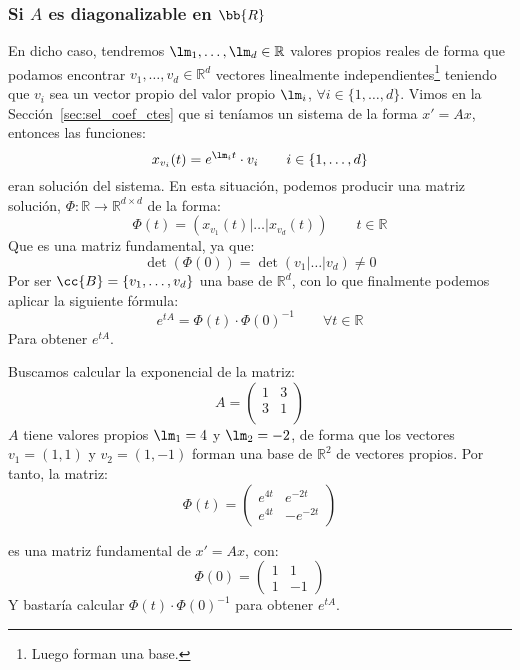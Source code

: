 \subsubsection{Si $A$ es diagonalizable en $\bb{R}$}
\noindent
En dicho caso, tendremos $\lm_1,\ldots,\lm_d\in \mathbb{R}$ valores propios reales de forma que podamos encontrar $v_1,\ldots,v_d\in \mathbb{R}^d$ vectores linealmente independientes\footnote{Luego forman una base.} teniendo que $v_i$ sea un vector propio del valor propio $\lm_i$, $\forall i \in \{1,\ldots,d\}$. Vimos en la Sección~\ref{sec:sel_coef_ctes} que si teníamos un sistema de la forma $x'=Ax$, entonces las funciones:
\begin{equation*}
    x_{v_i}(t) = e^{\lm_i t} \cdot v_i \qquad i \in \{1,\ldots,d\}
\end{equation*}
eran solución del sistema. En esta situación, podemos producir una matriz solución, $\Phi:\mathbb{R}\rightarrow\mathbb{R}^{d\times d}$ de la forma:
\begin{equation*}
    \Phi(t) = (x_{v_1}(t)|\ldots|x_{v_d}(t)) \qquad t\in \mathbb{R}
\end{equation*}
Que es una matriz fundamental, ya que:
\begin{equation*}
    \det(\Phi(0)) = \det(v_1 | \ldots | v_d) \neq 0
\end{equation*}
Por ser $\cc{B}=\{v_1,\ldots,v_d\}$ una base de $\mathbb{R}^d$, con lo que finalmente podemos aplicar la siguiente fórmula:
\begin{equation*}
    e^{tA} = \Phi(t)\cdot \Phi(0)^{-1} \qquad \forall t\in \mathbb{R}
\end{equation*}
Para obtener $e^{tA}$.
\begin{ejemplo}
    Buscamos calcular la exponencial de la matriz:
    \begin{equation*}
        A = \left(\begin{array}{cc}
                1 & 3 \\
                3 & 1 \\
        \end{array}\right)
    \end{equation*}
    $A$ tiene valores propios $\lm_1=4$ y $\lm_2=-2$, de forma que los vectores $v_1 = (1,1)$ y $v_2=(1,-1)$ forman una base de $\mathbb{R}^2$ de vectores propios. Por tanto, la matriz:
    \begin{equation*}
        \Phi(t) = \left(\begin{array}{cc}
                e^{4t} & e^{-2t} \\
                e^{4t} & -e^{-2t} 
        \end{array}\right)
    \end{equation*}

    es una matriz fundamental de $x' = Ax$, con:
    \begin{equation*}
        \Phi(0) = \left(\begin{array}{cc}
                1 & 1 \\
                1 & -1
        \end{array}\right)
    \end{equation*}
    Y bastaría calcular $\Phi(t)\cdot \Phi(0)^{-1}$ para obtener $e^{tA}$.
\end{ejemplo}

